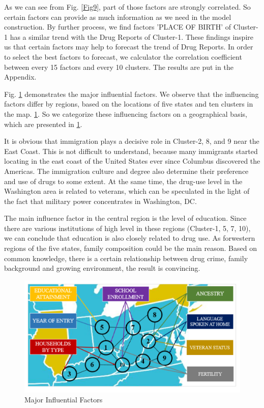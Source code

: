 \documentclass[12pt]{article}
\begin{document}
As we can see from Fig. \ref{Fig9}, part of those factors are strongly correlated. So certain factors can provide as much information as we need in the model construction. By further process, we find factors 'PLACE OF BIRTH' of Cluster-1 has a similar trend with the Drug Reports of Cluster-1. These findings inspire us that certain factors may help to forecast the trend of Drug Reports. In order to select the best factors to forecast, we calculator the correlation coefficient between every 15 factors and every 10 clusters. The results are put in the Appendix.

Fig. \ref{Fig11} demonstrates the major influential factors. We observe that the influencing factors differ by regions, based on the locations of five states and ten clusters in the map. \ref{Fig11}. So we categorize these influencing factors on a geographical basis, which are presented in \ref{Fig11}.

It is obvious that immigration plays a decisive role in Cluster-2, 8, and 9 near the East Coast. This is not difficult to understand, because many immigrants started locating in the east coast of the United States ever since Columbus discovered the Americas. The immigration culture and degree also determine their preference and use of drugs to some extent. At the same time, the drug-use level in the Washington area is related to veterans, which can be speculated in the light of the fact that military power concentrates in Washington, DC. 

The main influence factor in the central region is the level of education. Since there are various institutions of high level in these regions (Cluster-1, 5, 7, 10), we can conclude that education is also closely related to drug use. As forwestern regions of the five states, family composition could be the main reason. Based on common knowledge, there is a certain relationship between drug crime, family background and growing environment, the result is convincing.

\begin{figure}[H]
	\centering
	\includegraphics[scale=0.7]{./figures/11.png}
	\caption{Major Influential Factors}
	\label{Fig11}
\end{figure}
\end{document}
